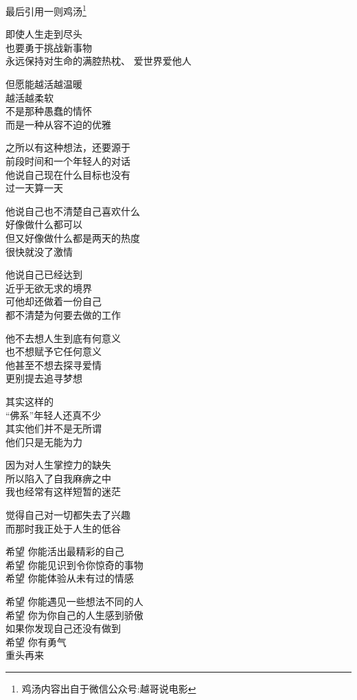 \documentclass[utf8]{book}
\begin{document}
	
	\begin{center}
		
		{\LARGE 最后引用一则鸡汤\footnote{鸡汤内容出自于微信公众号:越哥说电影}}
		
		即使人生走到尽头\\
		也要勇于挑战新事物\\
		永远保持对生命的满腔热枕、
		爱世界爱他人
		
		但愿能越活越温暖\\
		越活越柔软\\
		不是那种愚蠢的情怀\\
		而是一种从容不迫的优雅
		
		之所以有这种想法，还要源于\\
		前段时间和一个年轻人的对话\\
		他说自己现在什么目标也没有\\
		过一天算一天
		
		他说自己也不清楚自己喜欢什么\\
		好像做什么都可以\\
		但又好像做什么都是两天的热度\\
		很快就没了激情

		他说自己已经达到\\
		近乎无欲无求的境界\\
		可他却还做着一份自己\\
		都不清楚为何要去做的工作
		
		他不去想人生到底有何意义\\
		也不想赋予它任何意义\\
		他甚至不想去探寻爱情\\
		更别提去追寻梦想
		
		其实这样的\\
		“佛系”年轻人还真不少\\
		其实他们并不是无所谓\\
		他们只是无能为力
		
		因为对人生掌控力的缺失\\
		所以陷入了自我麻痹之中\\
		我也经常有这样短暂的迷茫
		
		觉得自己对一切都失去了兴趣\\
		而那时我正处于人生的低谷
		
		希望 你能活出最精彩的自己 \\
	    希望 你能见识到令你惊奇的事物\\ 
		希望 你能体验从未有过的情感 
		
		希望 你能遇见一些想法不同的人 \\
		希望 你为你自己的人生感到骄傲 \\
		如果你发现自己还没有做到 \\
		希望 你有勇气 \\
		重头再来
		

\end{center}
\end{document}
